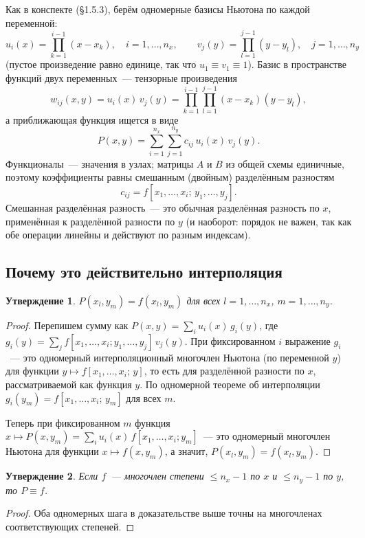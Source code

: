 \documentclass[11pt,a4paper]{report}
\newtheorem{utv}{Утверждение}[chapter]
\begin{document}
Как в конспекте (§1.5.3), берём одномерные базисы Ньютона по каждой переменной:
\[
u_i(x)=\prod_{k=1}^{i-1}(x-x_k),\quad i=1,\dots,n_x,\qquad
v_j(y)=\prod_{l=1}^{j-1}(y-y_l),\quad j=1,\dots,n_y
\]
(пустое произведение равно единице, так что $u_1\equiv v_1\equiv1$). Базис в
пространстве функций двух переменных~--- тензорные произведения
\[
w_{ij}(x,y)=u_i(x)\,v_j(y)=\prod_{k=1}^{i-1}\prod_{l=1}^{j-1}(x-x_k)(y-y_l),
\]
а приближающая функция ищется в виде
\[
P(x,y)=\sum_{i=1}^{n_x}\sum_{j=1}^{n_y}c_{ij}\,u_i(x)\,v_j(y).
\]
Функционалы~--- значения в узлах; матрицы $A$ и $B$ из общей схемы единичные,
поэтому коэффициенты равны смешанным (двойным) разделённым разностям
\[
c_{ij}=f[x_1,\dots,x_i;\,y_1,\dots,y_j].
\]
Смешанная разделённая разность~--- это обычная разделённая разность по $x$,
применённая к разделённой разности по $y$ (и наоборот: порядок не важен, так
как обе операции линейны и действуют по разным индексам).

\subsection{Почему это действительно интерполяция}

\begin{utv}
$P(x_l,y_m)=f(x_l,y_m)$ для всех $l=1,\dots,n_x$, $m=1,\dots,n_y$.
\end{utv}
\begin{proof}
Перепишем сумму как
$P(x,y)=\sum_i u_i(x)\,g_i(y)$, где
$g_i(y)=\sum_j f[x_1,\dots,x_i;y_1,\dots,y_j]\,v_j(y)$.
При фиксированном $i$ выражение $g_i$~--- это одномерный интерполяционный
многочлен Ньютона (по переменной $y$) для функции
$y\mapsto f[x_1,\dots,x_i;\,y]$, то есть для разделённой разности по $x$,
рассматриваемой как функция $y$. По одномерной теореме об интерполяции
$g_i(y_m)=f[x_1,\dots,x_i;\,y_m]$ для всех $m$.

Теперь при фиксированном $m$ функция
$x\mapsto P(x,y_m)=\sum_i u_i(x)\,f[x_1,\dots,x_i;y_m]$~--- это одномерный
многочлен Ньютона для функции $x\mapsto f(x,y_m)$, а значит,
$P(x_l,y_m)=f(x_l,y_m)$.
\end{proof}

\begin{utv}
Если $f$~--- многочлен степени $\le n_x-1$ по $x$ и $\le n_y-1$ по $y$, то
$P\equiv f$.
\end{utv}
\begin{proof}
Оба одномерных шага в доказательстве выше точны на многочленах
соответствующих степеней.
\end{proof}
\end{document}
